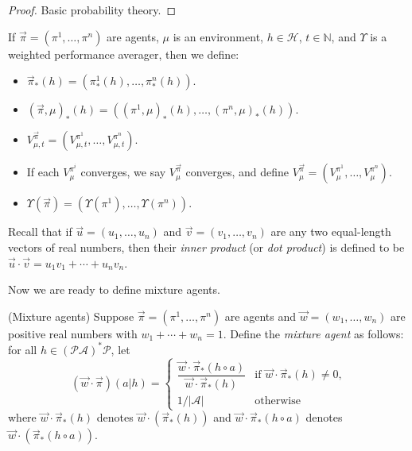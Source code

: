 \documentclass[runningheads]{llncs}
\begin{document}
\begin{proof}
    Basic probability theory.
\end{proof}

\begin{definition}
    If $\vec\pi=(\pi^1,\ldots,\pi^n)$ are agents, $\mu$ is an environment,
    $h\in\mathcal H$, $t\in\mathbb N$, and $\Upsilon$ is a weighted
    performance averager, then we define:
    \begin{itemize}
        \item $\vec\pi_*(h)=(\pi^1_*(h),\ldots,\pi^n_*(h))$.
        \item $(\vec\pi,\mu)_*(h)=((\pi^1,\mu)_*(h),\ldots,(\pi^n,\mu)_*(h))$.
        \item $V^{\vec\pi}_{\mu,t}=(V^{\pi^1}_{\mu,t},\ldots,V^{\pi^n}_{\mu,t})$.
        \item If each $V^{\pi^i}_\mu$ converges, we say $V^{\vec\pi}_\mu$
            converges, and define $V^{\vec\pi}_\mu=(V^{\pi^1}_\mu,\ldots,V^{\pi^n}_\mu)$.
        \item $\Upsilon(\vec\pi)=(\Upsilon(\pi^1),\ldots,\Upsilon(\pi^n))$.
    \end{itemize}
    Recall that if $\vec u=(u_1,\ldots,u_n)$ and
    $\vec v=(v_1,\ldots,v_n)$ are any two equal-length
    vectors of real numbers, then their \emph{inner product}
    (or \emph{dot product}) is defined to be
    $\vec u\cdot \vec v=u_1v_1+\cdots+u_nv_n$.
\end{definition}

Now we are ready to define mixture agents.

\begin{definition}
\label{maindefn}
    (Mixture agents)
    Suppose $\vec\pi=(\pi^1,\ldots,\pi^n)$ are agents and $\vec w=(w_1,\ldots,w_n)$
    are positive real numbers with $w_1+\cdots+w_n=1$.
    Define the \emph{mixture agent} as follows: for all
    $h\in (\mathcal P\mathcal A)^*\mathcal P$, let
    \[
        (\vec w\cdot\vec\pi)(a|h)
        =
        \begin{cases}
            \dfrac{\vec w\cdot \vec\pi_*(h\circ a)}{\vec w\cdot \vec\pi_*(h)}
            &\mbox{if $\vec w\cdot \vec\pi_*(h)\not=0$,}\\
            1/|\mathcal{A}| &\mbox{otherwise}
        \end{cases}
    \]
    where
    $\vec w\cdot \vec\pi_*(h)$ denotes $\vec w\cdot (\vec\pi_*(h))$
    and
    $\vec w\cdot\vec\pi_*(h\circ a)$ denotes
    $\vec w\cdot(\vec\pi_*(h\circ a))$.
\end{definition}
\end{document}
